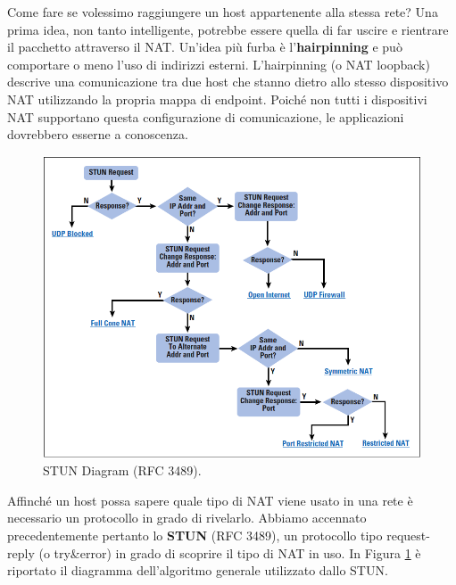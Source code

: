 Come fare se volessimo raggiungere un host appartenente alla stessa rete? Una prima idea, non tanto intelligente, potrebbe essere quella di far uscire e rientrare il pacchetto attraverso il NAT. Un'idea più furba è l'\textbf{hairpinning} e può comportare o meno l'uso di indirizzi esterni. L'hairpinning (o NAT loopback) descrive una comunicazione tra due host che stanno dietro allo stesso dispositivo NAT utilizzando la propria mappa di endpoint. Poiché non tutti i dispositivi NAT supportano questa configurazione di comunicazione, le applicazioni dovrebbero esserne a conoscenza.
\begin{figure}[htbp]
	\centering
	\includegraphics[scale = 0.4]{images/STUN}
	\caption{STUN Diagram (RFC 3489).}
	\label{img:STUN}
\end{figure}

Affinché un host possa sapere quale tipo di NAT viene usato in una rete è necessario un protocollo in grado di rivelarlo. Abbiamo accennato precedentemente pertanto lo \textbf{STUN} (RFC 3489), un protocollo tipo request-reply (o try\&error) in grado di scoprire il tipo di NAT in uso. In Figura \ref{img:STUN} è riportato il diagramma dell'algoritmo generale utilizzato dallo STUN.

